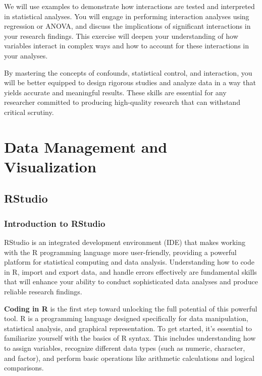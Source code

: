 \documentclass[
]{book}
\begin{document}
We will use examples to demonstrate how interactions are tested and interpreted in statistical analyses. You will engage in performing interaction analyses using regression or ANOVA, and discuss the implications of significant interactions in your research findings. This exercise will deepen your understanding of how variables interact in complex ways and how to account for these interactions in your analyses.

By mastering the concepts of confounds, statistical control, and interaction, you will be better equipped to design rigorous studies and analyze data in a way that yields accurate and meaningful results. These skills are essential for any researcher committed to producing high-quality research that can withstand critical scrutiny.

\chapter{Data Management and Visualization}\label{data-management-and-visualization}

\section{RStudio}\label{rstudio}

\subsection{Introduction to RStudio}\label{introduction-to-rstudio}

RStudio is an integrated development environment (IDE) that makes working with the R programming language more user-friendly, providing a powerful platform for statistical computing and data analysis. Understanding how to code in R, import and export data, and handle errors effectively are fundamental skills that will enhance your ability to conduct sophisticated data analyses and produce reliable research findings.

\textbf{Coding in R} is the first step toward unlocking the full potential of this powerful tool. R is a programming language designed specifically for data manipulation, statistical analysis, and graphical representation. To get started, it's essential to familiarize yourself with the basics of R syntax. This includes understanding how to assign variables, recognize different data types (such as numeric, character, and factor), and perform basic operations like arithmetic calculations and logical comparisons.
\end{document}
